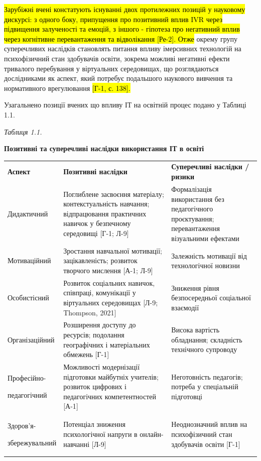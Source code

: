 \hl{Зарубіжні вчені констатують існуванні двох протилежних позицій у науковому дискурсі: з одного боку, припущення про позитивний вплив IVR через підвищення залученості та емоцій, з іншого - гіпотеза про негативний вплив через когнітивне перевантаження та відволікання {[}Ре-2{]}. Отже} окрему групу суперечливих наслідків становлять питання впливу імерсивних технологій на психофізичний стан здобувачів освіти, зокрема можливі негативні ефекти тривалого перебування у віртуальних середовищах, що розглядаються дослідниками як аспект, який потребує подальшого наукового вивчення та нормативного врегулювання \hl{{[}Г-1, с. 138{]}.}

Узагальнено позиції вчених що впливу ІТ на освітній процес подано у Таблиці 1.1.

\emph{Таблиця 1.1.}

\textbf{Позитивні та суперечливі наслідки використання ІТ в освіті}

{\def\LTcaptype{none} %
\begin{longtable}[]{@{}
  >{\centering\arraybackslash}p{}
  >{\centering\arraybackslash}p{}
  >{\centering\arraybackslash}p{}@{}}
\toprule\noalign{}
\endhead
\bottomrule\noalign{}
\endlastfoot
\textbf{Аспект} & \textbf{Позитивні наслідки} & \textbf{Суперечливі наслідки / ризики} \\
Дидактичний & Поглиблене засвоєння матеріалу; контекстуальність навчання; відпрацювання практичних навичок у безпечному середовищі {[}Г-1; Л-9{]} & Формалізація використання без педагогічного проєктування; перевантаження візуальними ефектами \\
Мотиваційний & Зростання навчальної мотивації; зацікавленість; розвиток творчого мислення {[}А-1; Л-9{]} & Залежність мотивації від технологічної новизни \\
Особистісний & Розвиток соціальних навичок, співпраці, комунікації у віртуальних середовищах {[}Л-9; Thompson, 2021{]} & Зниження рівня безпосередньої соціальної взаємодії \\
Організаційний & Розширення доступу до ресурсів; подолання географічних і матеріальних обмежень {[}Г-1{]} & Висока вартість обладнання; складність технічного супроводу \\
Професійно-

педагогічний & Можливості модернізації підготовки майбутніх учителів; розвиток цифрових і педагогічних компетентностей {[}А-1{]} & Неготовність педагогів; потреба у спеціальній підготовці \\
Здоров'я-

збережувальний & Потенціал зниження психологічної напруги в онлайн-навчанні {[}Л-9{]} & Неоднозначний вплив на психофізичний стан здобувачів освіти {[}Г-1{]} \\
\end{longtable}
}

